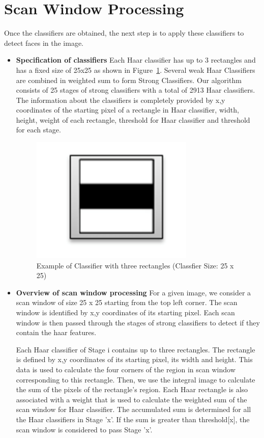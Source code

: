\section{Scan Window Processing}\label{sec:haar}

Once the classifiers are obtained, the next step is to apply these classifiers to detect faces in the image. 

\vspace{0.1in}
\begin{itemize}

    \item \textbf{Specification of classifiers}
Each Haar classifier has up to 3 rectangles and has a fixed size of 25x25 as shown in Figure~\ref{fig:classifier}. 
Several weak Haar Classifiers are combined in weighted sum to form Strong Classifiers. 
Our algorithm consists of 25 stages of strong classifiers with a total of 2913 Haar classifiers. 
The information about the classifiers is completely provided by x,y coordinates of the starting 
pixel of a rectangle in Haar classifier, width, height, weight of each rectangle, threshold for 
Haar classifier and threshold for each stage. 
\begin{figure}[h]
  \centering 
  \includegraphics[width=0.5\linewidth]{figs/class_crop.pdf}
  \caption{Example of Classifier with three rectangles (Classfier Size: 25 x 25)}
  \label{fig:classifier}
\end{figure}

\item \textbf{Overview of scan window processing}
For a given image, we consider a scan window of size 25 x 25 starting from the top left corner. 
The scan window is identified by x,y coordinates of its starting pixel. Each scan window is 
then passed through the stages of strong classifiers to detect if they contain the haar features. 

Each Haar classifier of Stage i contains up to three rectangles. The rectangle is defined by 
x,y coordinates of its starting pixel, its width and height. This data is used to calculate the 
four corners of the region in scan window corresponding to this rectangle. Then, we use the 
integral image to calculate the sum of the pixels of the rectangle’s region. Each Haar rectangle
is also associated with a weight that is used to calculate the weighted sum of the scan window for Haar
classifier. The accumulated sum is determined for all the Haar classifiers in Stage 'x'. If the sum 
is greater than threshold[x], the scan window is considered to pass Stage 'x'.


\end{itemize}
